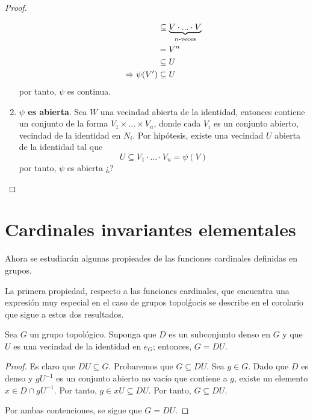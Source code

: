 \documentclass[12pt]{report}
\theoremstyle{largebreak}
\begin{document}
\begin{proof}
\begin{enumerate}
\begin{equation*}
\begin{split}
                    &\subseteq \underbrace{V\cdot...\cdot V}_{n\textup{-veces}}\\
                    &=V^n\\
                    &\subseteq U\\
                    \Rightarrow \psi(V')&\subseteq U\\
                \end{split}
            \end{equation*}
            por tanto, $\psi$ es continua.
            \item \textbf{$\psi$ es abierta}. Sea $W$ una vecindad abierta de la identidad, entonces contiene un conjunto de la forma $V_1\times...\times V_n$, donde cada $V_i$ es un conjunto abierto, vecindad de la identidad en $N_i$. Por hipótesis, existe una vecindad $U$ abierta de la identidad tal que
            \begin{equation*}
                U\subseteq V_1\cdot... \cdot V_n=\psi(V)
            \end{equation*}
            por tanto, $\psi$ es abierta ¿?
        \end{enumerate}
    \end{proof}

    \section{Cardinales invariantes elementales}

    Ahora se estudiarán algunas propieades de las funciones cardinales definidas en grupos.

    La primera propiedad, respecto a las funciones cardinales, que encuentra una expresión muy especial en el caso de grupos topolǵocis se describe en el corolario que sigue a estos dos resultados.

    \begin{lema}
        Sea $G$ un grupo topológico. Suponga que $D$ es un subconjunto denso en $G$ y que $U$ es una vecindad de la identidad en $e_G$; entonces, $G=DU$.
    \end{lema}

    \begin{proof}
        Es claro que $DU\subseteq G$. Probaremos que $G\subseteq DU$. Sea $g\in G$. Dado que $D$ es denso y $gU^{-1}$ es un conjunto abierto no vacío que contiene a $g$, existe un elemento $x\in D\cap gU^{-1}$. Por tanto, $g\in xU\subseteq DU$. Por tanto, $G\subseteq DU$.

        Por ambas contenciones, se sigue que $G=DU$.
    \end{proof}
\end{document}
